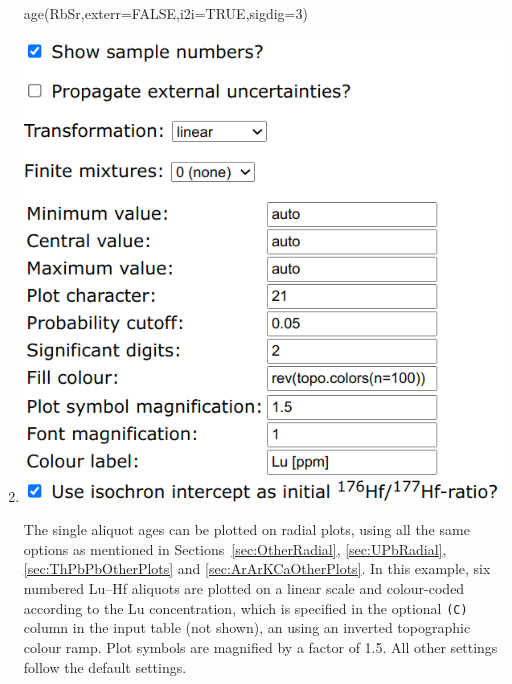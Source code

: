 \begin{refsection}
\begin{enumerate}
\begin{console}
age(RbSr,exterr=FALSE,i2i=TRUE,sigdig=3)
\end{console}

\item\noindent\begin{minipage}[t]{.55\linewidth}
\strut\vspace*{-\baselineskip}\newline
\includegraphics[width=\linewidth]{../figures/LuHfRadial.png}
\end{minipage}
\begin{minipage}[t]{.45\linewidth}
  The single aliquot ages can be plotted on radial plots, using all
  the same options as mentioned in Sections~\ref{sec:OtherRadial},
  \ref{sec:UPbRadial}, \ref{sec:ThPbPbOtherPlots} and
  \ref{sec:ArArKCaOtherPlots}. In this example, six numbered Lu--Hf
  aliquots are plotted on a linear scale and colour-coded according to
  the Lu concentration, which is specified in the optional
  \texttt{(C)} column in the input table (not shown), an using an
  inverted topographic colour ramp.  Plot symbols are magnified by a
  factor of 1.5. All other settings follow the default settings.
\end{minipage}



\end{enumerate}
\end{refsection}
